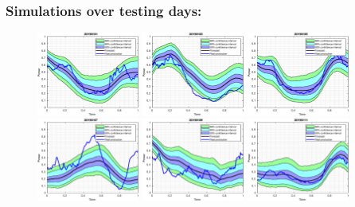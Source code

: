 \documentclass[aspectratio=169]{beamer}\usepackage[utf8]{inputenc}
\begin{document}

\begin{frame}\frametitle{Simulations over testing days:}

\begin{figure}[ht!]
\centering
\includegraphics[width=0.3\textwidth]{../../MATLAB_Files/Results/bands_testing_days/optimal_value/1.eps}
\includegraphics[width=0.3\textwidth]{../../MATLAB_Files/Results/bands_testing_days/optimal_value/2.eps}
\includegraphics[width=0.3\textwidth]{../../MATLAB_Files/Results/bands_testing_days/optimal_value/3.eps}
\includegraphics[width=0.3\textwidth]{../../MATLAB_Files/Results/bands_testing_days/optimal_value/4.eps}
\includegraphics[width=0.3\textwidth]{../../MATLAB_Files/Results/bands_testing_days/optimal_value/5.eps}
\includegraphics[width=0.3\textwidth]{../../MATLAB_Files/Results/bands_testing_days/optimal_value/6.eps}
\end{figure}

\end{frame}
\end{document}
